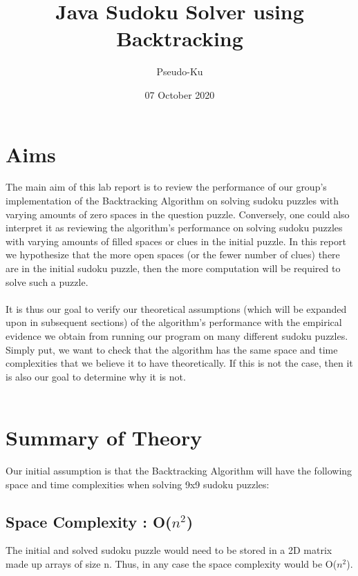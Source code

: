 \documentclass{article}
\author{Pseudo-Ku}
\title{Java Sudoku Solver using Backtracking}
\date{07 October 2020}
\begin{document}
    \begin{titlepage}
        \maketitle{}
    \end{titlepage}
    
    \tableofcontents

    \pagebreak 
    \section{Aims}
The main aim of this lab report is to review the performance of our group’s implementation of the Backtracking Algorithm on solving sudoku puzzles with varying amounts of zero spaces in the question puzzle. Conversely, one could also interpret it as reviewing the algorithm’s performance on solving sudoku puzzles with varying amounts of filled spaces or clues in the initial puzzle. In this report we hypothesize that the more open spaces (or the fewer number of clues) there are in the initial sudoku puzzle, then the more computation will be required to solve such a puzzle. 
\\\\
It is thus our goal to verify our theoretical assumptions (which will be expanded upon in subsequent sections) of the algorithm’s performance with the empirical evidence we obtain from running our program on many different sudoku puzzles. Simply put, we want to check that the algorithm has the same space and time complexities that we believe it to have theoretically. If this is not the case, then it is also our goal to determine why it is not. 
\\\\

    \section{Summary of Theory}
    
	Our initial assumption is that the Backtracking Algorithm will have the following space and time complexities when solving 9x9 sudoku puzzles:
	\\
	\subsection{Space Complexity : O($n^2$)}
	
	The initial and solved sudoku puzzle would need to be stored in a 2D matrix made up arrays of size n. Thus, in any case the space complexity would be O($n^2$).\cite{GeeksforGeeks}
	\\
\end{document}
